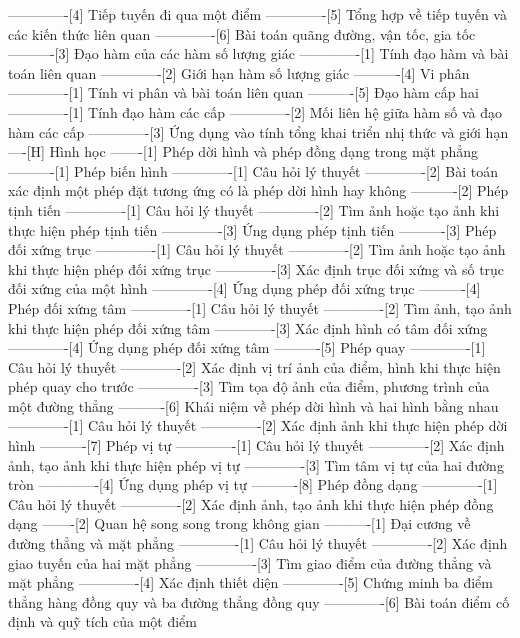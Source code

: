 -------------[4] Tiếp tuyến đi qua một điểm
-------------[5] Tổng hợp về tiếp tuyến và các kiến thức liên quan
-------------[6] Bài toán quãng đường, vận tốc, gia tốc
----------[3] Đạo hàm của các hàm số lượng giác
-------------[1] Tính đạo hàm và bài toán liên quan
-------------[2] Giới hạn hàm số lượng giác
----------[4] Vi phân
-------------[1] Tính vi phân và bài toán liên quan
----------[5] Đạo hàm cấp hai
-------------[1] Tính đạo hàm các cấp
-------------[2] Mối liên hệ giữa hàm số và đạo hàm các cấp
-------------[3] Ứng dụng vào tính tổng khai triển nhị thức và giới hạn
----[H] Hình học
-------[1] Phép dời hình và phép đồng dạng trong mặt phẳng
----------[1] Phép biến hình
-------------[1] Câu hỏi lý thuyết
-------------[2] Bài toán xác định một phép đặt tương ứng có là phép dời hình hay không
----------[2] Phép tịnh tiến
-------------[1] Câu hỏi lý thuyết
-------------[2] Tìm ảnh hoặc tạo ảnh khi thực hiện phép tịnh tiến
-------------[3] Ứng dụng phép tịnh tiến
----------[3] Phép đối xứng trục
-------------[1] Câu hỏi lý thuyết
-------------[2] Tìm ảnh hoặc tạo ảnh khi thực hiện phép đối xứng trục
-------------[3] Xác định trục đối xứng và số trục đối xứng của một hình
-------------[4] Ứng dụng phép đối xứng trục
----------[4] Phép đối xứng tâm
-------------[1] Câu hỏi lý thuyết
-------------[2] Tìm ảnh, tạo ảnh khi thực hiện phép đối xứng tâm
-------------[3] Xác định hình có tâm đối xứng
-------------[4] Ứng dụng phép đối xứng tâm
----------[5] Phép quay
-------------[1] Câu hỏi lý thuyết
-------------[2] Xác định vị trí ảnh của điểm, hình khi thực hiện phép quay cho trước
-------------[3] Tìm tọa độ ảnh của điểm, phương trình của một đường thẳng
----------[6] Khái niệm về phép dời hình và hai hình bằng nhau
-------------[1] Câu hỏi lý thuyết
-------------[2] Xác định ảnh khi thực hiện phép dời hình
----------[7] Phép vị tự
-------------[1] Câu hỏi lý thuyết
-------------[2] Xác định ảnh, tạo ảnh khi thực hiện phép vị tự
-------------[3] Tìm tâm vị tự của hai đường tròn
-------------[4] Ứng dụng phép vị tự
----------[8] Phép đồng dạng
-------------[1] Câu hỏi lý thuyết
-------------[2] Xác định ảnh, tạo ảnh khi thực hiện phép đồng dạng
-------[2] Quan hệ song song trong không gian
----------[1] Đại cương về đường thẳng và mặt phẳng
-------------[1] Câu hỏi lý thuyết
-------------[2] Xác định giao tuyến của hai mặt phẳng
-------------[3] Tìm giao điểm của đường thẳng và mặt phẳng
-------------[4] Xác định thiết diện
-------------[5] Chứng minh ba điểm thẳng hàng đồng quy và ba đường thẳng đồng quy
-------------[6] Bài toán điểm cố định và quỹ tích của một điểm
